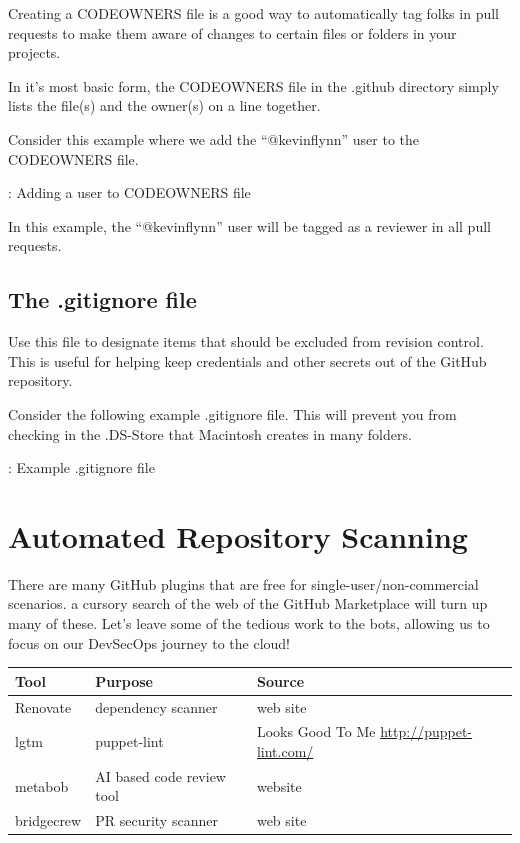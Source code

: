 \justifying
Creating a CODEOWNERS file is a good way to automatically tag folks in pull requests to make them aware of
changes to certain files or folders in your projects.

\justifying
In it's most basic form, the CODEOWNERS file in the .github directory simply lists the file(s) and the owner(s) on a line together.

\justifying
Consider this example where we add the ``@kevinflynn'' user to the CODEOWNERS file.

\begin{mybox}{\thetcbcounter: Adding a user to CODEOWNERS file}
      
\end{mybox}

\justifying
In this example, the ``@kevinflynn'' user will be tagged as a reviewer in all pull requests.

\subsection{The .gitignore file}

\justifying
Use this file to designate items that should be excluded from revision
control. This is useful for helping keep credentials and other secrets out of the GitHub repository.

\justifying
Consider the following example .gitignore file. This will prevent you from checking in the .DS-Store that
Macintosh creates in many folders.

\begin{mybox}{\thetcbcounter: Example .gitignore file}
      
\end{mybox}

\section{Automated Repository Scanning}

\justifying
There are many GitHub plugins that are free for single-user/non-commercial scenarios. a cursory search of the web of the
GitHub Marketplace will turn up many of these. Let's leave some of the
tedious work to the bots, allowing us to focus on our DevSecOps journey to the cloud!

\justifying
\begin{tabular}{| p{2.3cm}| p{4.5cm} | p{8.5cm} |}
      \hline
     \textbf{Tool}& \textbf{Purpose}& \textbf{Source} \\
      \hline
      Renovate & dependency scanner & web site \\
      \hline
      lgtm & puppet-lint & Looks Good To Me \url{http://puppet-lint.com/} \\
      \hline
      metabob & AI based code review tool & website \\
      \hline
      bridgecrew & PR security scanner & web site \\
      \hline
\end{tabular}

